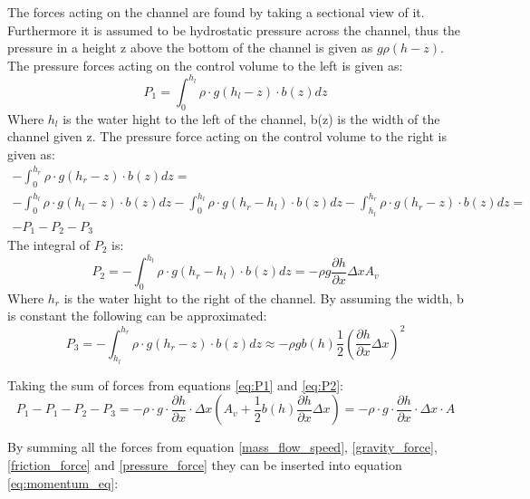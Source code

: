 The forces acting on the channel are found by taking a sectional view of it. Furthermore it is assumed to be hydrostatic pressure across the channel, thus the pressure in a height z above the bottom of the channel is given as $g\rho(h-z)$.  
The pressure forces acting on the control volume to the left is given as:
\begin{equation}\label{eq:P1}
	P_1 = \int_{0}^{h_l} \rho \cdot g (h_l - z)\cdot b(z) dz
\end{equation}
Where $h_l$ is the water hight to the left of the channel, b(z) is the width of the channel given z. The pressure force acting on the control volume to the right is given as:
\begin{equation}\label{eq:P2}
\begin{array}{l}
	-\int_{0}^{h_r} \rho \cdot g (h_r - z)\cdot b(z)dz = \\
	-\int_{0}^{h_l} \rho \cdot g (h_l - z)\cdot b(z)dz -\int_{0}^{h_l} \rho \cdot g (h_r- h_l)\cdot b(z)dz -\int_{h_l}^{h_r} \rho \cdot g (h_r - z)\cdot b(z)dz = \\
	-P_1 - P_2 - P_3
\end{array}	
\end{equation}
The integral of $P_2$ is: 
\begin{equation}
	P_2 = -\int_{0}^{h_l} \rho \cdot g (h_r - h_l)\cdot b(z)dz = -\rho g \frac{\partial h}{\partial x}\Delta x A_v
\end{equation}
Where $h_r$ is the water hight to the right of the channel. By assuming the width, b is constant the following can be approximated: 
\begin{equation}
	P_3 = -\int_{h_l}^{h_r} \rho \cdot g (h_r - z)\cdot b(z)dz \approx -\rho g b(h) \frac{1}{2}\left(\frac{\partial h}{\partial x}\Delta x\right)^2
\end{equation}	

Taking the sum of forces from equations \ref{eq:P1} and \ref{eq:P2}:
\begin{equation}
P_1 - P_1 -P_2 - P_3 =-\rho\cdot g \cdot \frac{\partial h}{\partial x} \cdot \Delta x \left(A_v + \frac{1}{2}b(h)\frac{\partial h}{\partial x} \Delta x \right) =-\rho\cdot g \cdot \frac{\partial h}{\partial x} \cdot \Delta x  \cdot A  
\label{pressure_force}
\end{equation}

By summing all the forces from equation \ref{mass_flow_speed}, \ref{gravity_force}, \ref{friction_force} and \ref{pressure_force} they can be inserted into equation \ref{eq:momentum_eq}:

